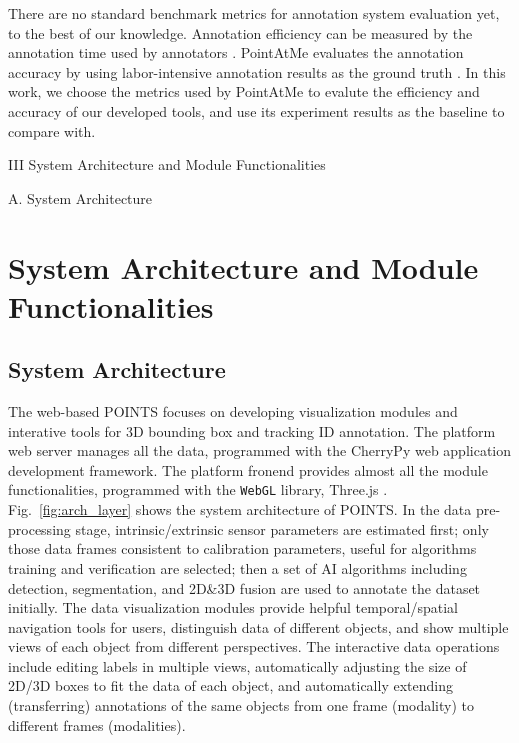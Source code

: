 \documentclass[letterpaper, 10 pt, conference]{ieeeconf}  %
\begin{document}
There are no standard benchmark metrics for annotation system evaluation yet, to the best of our knowledge.
Annotation efficiency can be measured by the annotation time used by annotators \cite{monica2017multi,pointatme,Zimmer20193DBA}. 
PointAtMe evaluates the annotation accuracy by using labor-intensive annotation results as the ground truth \cite{pointatme}. 
In this work, we choose the metrics used by PointAtMe \cite{pointatme} to evalute the efficiency and accuracy of our developed tools, 
and use its experiment results as the baseline to compare with.



III System Architecture and Module Functionalities

A. System Architecture



\section{System Architecture and Module Functionalities}
\label{sec:systemarch}

\subsection{System Architecture}

The web-based POINTS focuses on developing visualization modules and interative tools for 3D bounding box and tracking ID annotation.
The platform web server manages all the data, programmed with the CherryPy \cite{cherrypy} web application development framework.
The platform fronend provides almost all the module functionalities, programmed with the \texttt{WebGL} library, Three.js \cite{threejs}.
Fig.~\ref{fig:arch_layer} shows the system architecture of POINTS.
In the data pre-processing stage, intrinsic/extrinsic sensor parameters are estimated first; only those data frames consistent to calibration parameters, useful for algorithms training and verification are selected; then a set of AI algorithms including detection, segmentation, and 2D\&3D fusion are used to annotate the dataset initially. The data visualization modules provide helpful temporal/spatial navigation tools for users, distinguish data of different objects, and show multiple views of each object from different perspectives. The interactive data operations include editing labels in multiple views, automatically adjusting the size of 2D/3D boxes to fit the data of each object, and automatically extending (transferring) annotations of the same objects from one frame (modality) to different frames (modalities).
\end{document}
